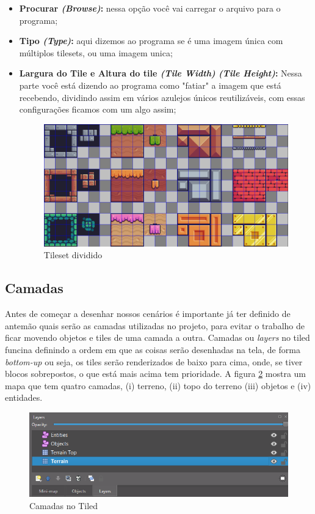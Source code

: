 \begin{itemize}
    \item \textbf{Procurar \textit{(Browse)}:} nessa opção você vai carregar o arquivo para o programa;
    \item \textbf{Tipo \textit{(Type)}:} aqui dizemos ao programa se é uma imagem única com múltiplos tilesets, ou uma imagem unica;
    \item \textbf{Largura do Tile e Altura do tile \textit{(Tile Width)} \textit{(Tile Height)}:} Nessa parte você está dizendo ao programa como "fatiar" a imagem que está recebendo, dividindo assim em vários azulejos únicos reutilizáveis, com essas configurações ficamos com um algo assim;
    \begin{figure}[h!]
        \centering
        \includegraphics[width=0.8\linewidth]{figuras/tileset-dividido.png}
        \caption{Tileset dividido}
        \label{fig:tileset-dividido}
    \end{figure}
\end{itemize}

\subsection{Camadas}
Antes de começar a desenhar nossos cenários é importante já ter definido de antemão quais serão as camadas utilizadas no projeto, para evitar o trabalho de ficar movendo objetos e tiles de uma camada a outra. Camadas ou \textit{layers} no tiled funcina definindo a ordem em que as coisas serão desenhadas na tela, de forma \textit{bottom-up} ou seja, os tiles serão renderizados de baixo para cima, onde, se tiver blocos sobrepostos, o que está mais acima tem prioridade. A figura \ref{fig:layers} mostra um mapa que tem quatro camadas, (i) terreno, (ii) topo do terreno (iii) objetos e (iv) entidades. 
\begin{figure}[h!]
    \centering
    \includegraphics[width=1\linewidth]{figuras/layers.png}
    \caption{Camadas no Tiled}
    \label{fig:layers}
\end{figure}


